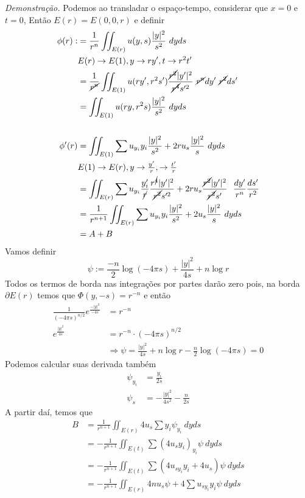 \documentclass[11pt]{article}
\newcommand{\p}{\partial}
\begin{document}
\textit{Demonstração.} Podemos ao transladar o espaço-tempo, considerar que \(x=0\) e \(t=0\), Então \(E(r) = E(0,0,r)\) e definir \begin{align*}
	\phi(r) :&= \frac{1}{r^n} \iint_{E(r)} u(y,s) \frac{|y|^2}{s^2}\ dy ds\\
	&E(r)\rightarrow E(1), y \rightarrow ry', t\rightarrow r^2t'\\
	&= \frac{1}{\cancel{r^n}} \iint_{E(1)} u(ry', r^2s') \frac{\cancel{r^2}|y'|^2}{\cancel{r^4}s'^2}\ \cancel{r^n}dy'\ \cancel{r^2}ds'\\  
	&=\iint_{E(1)} u(ry, r^2s) \frac{|y|^2}{s^2}\ dyds\\
	\\
	\phi'(r) &= \iint_{E(1)} \sum u_{y_i}y_i\frac{|y|^2}{s^2} + 2ru_s\frac{|y|^2}{s}\ dyds\\
	&E(1)\rightarrow E(r), y \rightarrow \tfrac{y'}{r}, \rightarrow \tfrac{t'}{r}\\
	&=\iint_{E(r)} \sum u_{y_i}\frac{y'_i}{\cancel{r}}\frac{r^{\cancel{4}}|y'|^2}{\cancel{r^2} s'^2} + 2ru_s\frac{\cancel{r^2}|y'|^2}{\cancel{r^2}s'}\ \  \frac{dy'}{r^n}\frac{ds'}{r^2}\\
	&= \frac{1}{r^{n+1}} \iint_{E(r)} \sum u_{y_i}y_i\frac{|y|^2}{s^2} + 2u_s\frac{|y|^2}{s}\ dyds\\
	&= A + B
\end{align*}
Vamos definir \[\psi := \frac{-n}{2}\log (-4\pi s) + \frac{|y|^2}{4s} + n\log r\]
Todos os termos de borda nas integrações por partes darão zero pois, na borda \(\p E(r)\) temos que \(\Phi(y,-s)=r^{-n}\) e então\begin{align*}
	\frac{1}{(-4\pi s)^{n/2}} e^{\frac{-|y|^2}{-4s}}&=r^{-n} \\
	e^{\frac{|y|^2}{4s}} &= r^{-n}\cdot (-4\pi s)^{n/2} \\
	&\Rightarrow \psi = \frac{|y|^2}{4s} +n \log r -\frac{n}{2}\log(-4\pi s) =0
\end{align*}
Podemos calcular suas derivada também \begin{align*}
	\psi_{y_i} &=  \frac{y_i}{2s}\\
	\psi_s &= - \frac{|y|^2}{4s^2} -\frac{n}{2s}
\end{align*}
A partir daí, temos que \begin{align*}
	B &= \frac{1}{r^{n+1}}\iint_{E(r)} 4u_s \sum y_i \psi_{y_i}\ dy ds\\
	&=-\frac{1}{r^{n+1}} \iint_{E(t)} \sum \left(4u_sy_i\right)_{y_i} \psi\ dy ds\\
	&=-\frac{1}{r^{n+1}} \iint_{E(t)} \sum \left(4u_{sy_i}y_i + 4u_s\right) \psi\ dy ds\\
	&= -\frac{1}{r^{n+1}}\iint_{E(r)} 4n u_s\psi + 4\sum u_{sy_i} y_i \psi \ dyds 
\end{align*}
\end{document}
